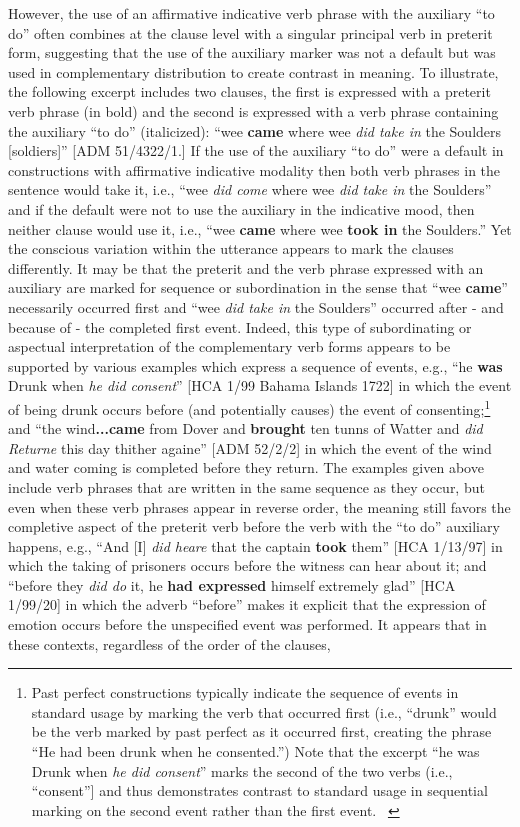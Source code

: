\documentclass[12pt]{article}
\newenvironment{styleStandard}{\renewcommand\baselinestretch{1.0}\setlength\leftskip{0cm}\setlength\rightskip{0cm plus 1fil}\setlength\parindent{0cm}\setlength\parfillskip{0pt plus 1fil}\setlength\parskip{0in plus 1pt}\writerlistparindent\writerlistleftskip\leavevmode\normalfont\normalsize\writerlistlabel\ignorespaces}{\unskip\vspace{0in plus 1pt}\par}
\newcommand\writerlistleftskip{}
\newcommand\writerlistparindent{}
\newcommand\writerlistlabel{}
\begin{document}
\begin{styleStandard}
However, the use of an affirmative indicative verb phrase with the auxiliary “to do” often combines at the clause level with a singular principal verb in preterit form, suggesting that the use of the auxiliary marker was not a default but was used in complementary distribution to create contrast in meaning. To illustrate, the following excerpt includes two clauses, the first is expressed with a preterit verb phrase (in bold) and the second is expressed with a verb phrase containing the auxiliary “to do” (italicized): “wee \textbf{came} where wee \textit{did take in} the Soulders [soldiers]” [ADM 51/4322/1.] If the use of the auxiliary “to do” were a default in constructions with affirmative indicative modality then both verb phrases in the sentence would take it, i.e., “wee \textit{did come} where wee \textit{did take in} the Soulders” and if the default were not to use the auxiliary in the indicative mood, then neither clause would use it, i.e., “wee \textbf{came} where wee \textbf{took in} the Soulders.” Yet the conscious variation within the utterance appears to mark the clauses differently. It may be that the preterit and the verb phrase expressed with an auxiliary are marked for sequence or subordination in the sense that “wee \textbf{came}” necessarily occurred first and “wee \textit{did take in} the Soulders” occurred after - and because of - the completed first event. Indeed, this type of subordinating or aspectual interpretation of the complementary verb forms appears to be supported by various examples which express a sequence of events, e.g., “he \textbf{was} Drunk when \textit{he did consent}” [HCA 1/99 Bahama Islands 1722] in which the event of being drunk occurs before (and potentially causes) the event of consenting;\footnote{ Past perfect constructions typically indicate the sequence of events in standard usage by marking the verb that occurred first (i.e., “drunk” would be the verb marked by past perfect as it occurred first, creating the phrase “He had been drunk when he consented.”) Note that the excerpt “he was Drunk when \textit{he did consent}” marks the second of the two verbs (i.e., “consent”] and thus demonstrates contrast to standard usage in sequential marking on the second event rather than the first event. \ } and “the wind\textbf{...came} from Dover and \textbf{brought} ten tunns of Watter and \textit{did Returne} this day thither againe” [ADM 52/2/2] in which the event of the wind and water coming is completed before they return. The examples given above include verb phrases that are written in the same sequence as they occur, but even when these verb phrases appear in reverse order, the meaning still favors the completive aspect of the preterit verb before the verb with the “to do” auxiliary happens, e.g., “And [I] \textit{did heare} that the captain \textbf{took }them” [HCA 1/13/97] in which the taking of prisoners occurs before the witness can hear about it; and “before they \textit{did do} it, he \textbf{had expressed }himself extremely glad” [HCA 1/99/20] in which the adverb “before” makes it explicit that the expression of emotion occurs before the unspecified event was performed. It appears that in these contexts, regardless of the order of the clauses, 
\end{styleStandard}
\end{document}
